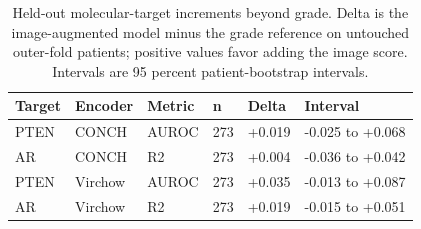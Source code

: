 \begin{table}[H]
\centering
\scriptsize
\caption{Held-out molecular-target increments beyond grade. Delta is the image-augmented model minus the grade reference on untouched outer-fold patients; positive values favor adding the image score. Intervals are 95 percent patient-bootstrap intervals.}
\label{tab:supp-conditional-increments}
\begin{tabular}{@{}p{}p{}p{}p{}p{}p{}@{}}
\toprule
Target & Encoder & Metric & n & Delta & Interval \\
\midrule
PTEN & CONCH & AUROC & 273 & +0.019 & -0.025 to +0.068 \\
AR & CONCH & R2 & 273 & +0.004 & -0.036 to +0.042 \\
PTEN & Virchow & AUROC & 273 & +0.035 & -0.013 to +0.087 \\
AR & Virchow & R2 & 273 & +0.019 & -0.015 to +0.051 \\
\bottomrule
\end{tabular}
\end{table}
